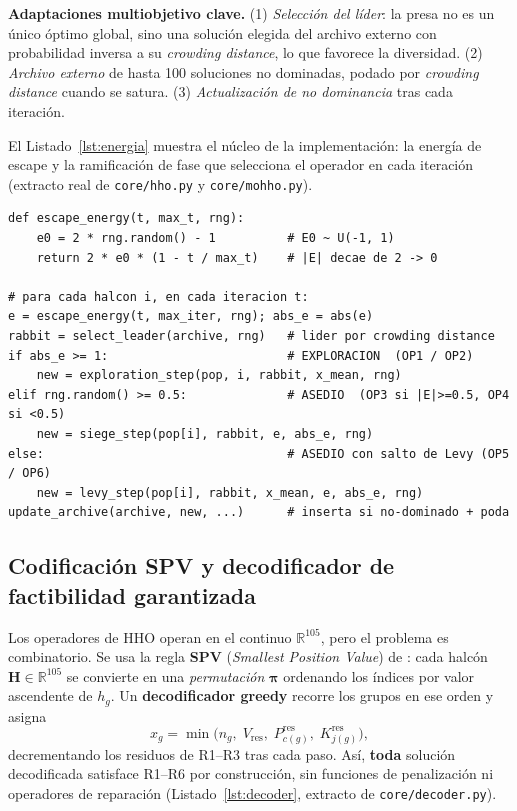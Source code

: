 \documentclass[11pt,letterpaper]{article}
\begin{document}
\begin{yellowbox}
\textbf{Adaptaciones multiobjetivo clave.} (1) \emph{Selección del líder}: la presa no es un único óptimo global, sino una solución elegida del archivo externo con probabilidad inversa a su \textit{crowding distance}, lo que favorece la diversidad. (2) \emph{Archivo externo} de hasta 100 soluciones no dominadas, podado por \textit{crowding distance} cuando se satura. (3) \emph{Actualización de no dominancia} tras cada iteración.
\end{yellowbox}

El Listado~\ref{lst:energia} muestra el núcleo de la implementación: la energía de escape y la ramificación de fase que selecciona el operador en cada iteración (extracto real de \texttt{core/hho.py} y \texttt{core/mohho.py}).

\begin{lstlisting}[style=vp,caption={Energía de escape y selección de fase (exploración / asedio / Lévy).},label={lst:energia}]
def escape_energy(t, max_t, rng):
    e0 = 2 * rng.random() - 1          # E0 ~ U(-1, 1)
    return 2 * e0 * (1 - t / max_t)    # |E| decae de 2 -> 0

# para cada halcon i, en cada iteracion t:
e = escape_energy(t, max_iter, rng); abs_e = abs(e)
rabbit = select_leader(archive, rng)   # lider por crowding distance
if abs_e >= 1:                         # EXPLORACION  (OP1 / OP2)
    new = exploration_step(pop, i, rabbit, x_mean, rng)
elif rng.random() >= 0.5:              # ASEDIO  (OP3 si |E|>=0.5, OP4 si <0.5)
    new = siege_step(pop[i], rabbit, e, abs_e, rng)
else:                                  # ASEDIO con salto de Levy (OP5 / OP6)
    new = levy_step(pop[i], rabbit, x_mean, e, abs_e, rng)
update_archive(archive, new, ...)      # inserta si no-dominado + poda
\end{lstlisting}

\subsection{Codificación SPV y decodificador de factibilidad garantizada}
Los operadores de HHO operan en el continuo $\mathbb{R}^{105}$, pero el problema es combinatorio. Se usa la regla \textbf{SPV} (\textit{Smallest Position Value}) de \textcite{bean1994}: cada halcón $\mathbf{H}\in\mathbb{R}^{105}$ se convierte en una \emph{permutación} $\boldsymbol{\pi}$ ordenando los índices por valor ascendente de $h_g$. Un \textbf{decodificador greedy} recorre los grupos en ese orden y asigna
\[
x_g = \min\!\bigl(n_g,\; V_{\text{res}},\; P_{c(g)}^{\text{res}},\; K_{j(g)}^{\text{res}}\bigr),
\]
decrementando los residuos de R1--R3 tras cada paso. Así, \textbf{toda} solución decodificada satisface R1--R6 por construcción, sin funciones de penalización ni operadores de reparación (Listado~\ref{lst:decoder}, extracto de \texttt{core/decoder.py}).
\end{document}
